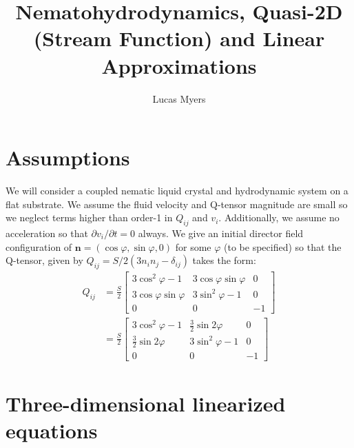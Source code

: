 \documentclass[reqno]{article}
\begin{document}
	\title{Nematohydrodynamics, Quasi-2D (Stream Function) and Linear Approximations}
	\author{Lucas Myers}
	\maketitle
	
	\section*{Assumptions}
	We will consider a coupled nematic liquid crystal and hydrodynamic system on a flat substrate. We assume the fluid velocity and Q-tensor magnitude are small so we neglect terms higher than order-1 in $Q_{ij}$ and $v_i$. Additionally, we assume no acceleration so that $\partial v_i/\partial t = 0$ always. We give an initial director field configuration of $\mathbf{n} = (\cos\varphi, \sin\varphi, 0)$ for some $\varphi$ (to be specified) so that the Q-tensor, given by $Q_{ij} = S/2(3n_i n_j - \delta_{ij})$ takes the form:
	\begin{align}
		Q_{ij} &= \frac{S}{2}\left[
			\begin{matrix}
				3\cos^2\varphi - 1 & 3\cos\varphi\sin\varphi & 0 \\
				3\cos\varphi\sin\varphi & 3\sin^2\varphi - 1 & 0 \\
				0 & 0 & -1
			\end{matrix}
		\right]\\
		&= \frac{S}{2}\left[
			\begin{matrix}
				3\cos^2\varphi - 1 & \frac{3}{2}\sin2\varphi & 0 \\
				\frac{3}{2}\sin2\varphi & 3\sin^2\varphi - 1 & 0 \\
				0 & 0 & -1
			\end{matrix}
		\right]
	\end{align}
	
	\section{Three-dimensional linearized equations}
	
\end{document}
